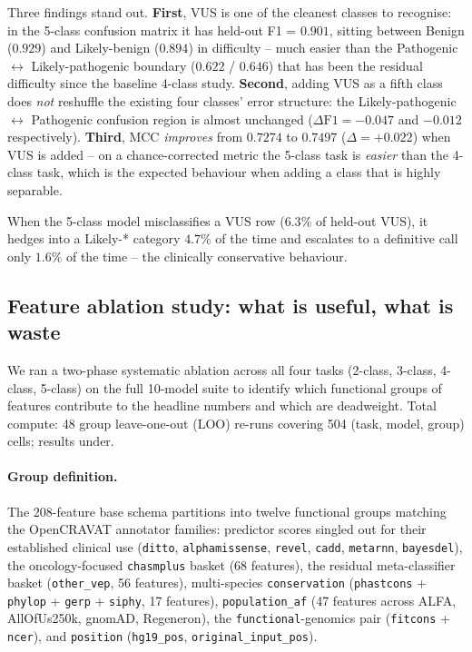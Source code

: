 \documentclass[11pt,a4paper]{article}
\begin{document}
Three findings stand out. \textbf{First}, VUS is one of the cleanest
classes to recognise: in the 5-class confusion matrix it has held-out
F1 = $0.901$, sitting between Benign ($0.929$) and Likely-benign ($0.894$)
in difficulty -- much easier than the Pathogenic $\leftrightarrow$
Likely-pathogenic boundary ($0.622$ / $0.646$) that has been the
residual difficulty since the baseline 4-class study. \textbf{Second},
adding VUS as a fifth class does \emph{not} reshuffle the existing four
classes' error structure: the Likely-pathogenic $\leftrightarrow$
Pathogenic confusion region is almost unchanged
($\Delta\text{F1} = -0.047$ and $-0.012$ respectively). \textbf{Third},
MCC \emph{improves} from $0.7274$ to $0.7497$ ($\Delta=+0.022$) when VUS
is added -- on a chance-corrected metric the 5-class task is
\emph{easier} than the 4-class task, which is the expected behaviour when
adding a class that is highly separable.

When the 5-class model misclassifies a VUS row ($6.3\%$ of held-out
VUS), it hedges into a Likely-* category $4.7\%$ of the time and
escalates to a definitive call only $1.6\%$ of the time -- the
clinically conservative behaviour.


\subsection{Feature ablation study: what is useful, what is waste}
\label{sec:feature-ablation}

We ran a two-phase systematic ablation across all four tasks
(2-class, 3-class, 4-class, 5-class) on the full 10-model suite to
identify which functional groups of features contribute to the headline
numbers and which are deadweight. Total compute: 48 group leave-one-out
(LOO) re-runs covering 504 (task, model, group) cells; results under.

\paragraph{Group definition.}
The 208-feature base schema partitions into twelve functional groups
matching the OpenCRAVAT annotator families: predictor scores singled out
for their established clinical use (\texttt{ditto}, \texttt{alphamissense},
\texttt{revel}, \texttt{cadd}, \texttt{metarnn}, \texttt{bayesdel}), the
oncology-focused \texttt{chasmplus} basket (68 features), the
residual meta-classifier basket (\texttt{other\_vep}, 56 features),
multi-species \texttt{conservation} (\texttt{phastcons} + \texttt{phylop}
+ \texttt{gerp} + \texttt{siphy}, 17 features), \texttt{population\_af}
(47 features across ALFA, AllOfUs250k, gnomAD, Regeneron), the
\texttt{functional}-genomics pair (\texttt{fitcons} + \texttt{ncer}), and
\texttt{position} (\texttt{hg19\_pos}, \texttt{original\_input\_pos}).
\end{document}
